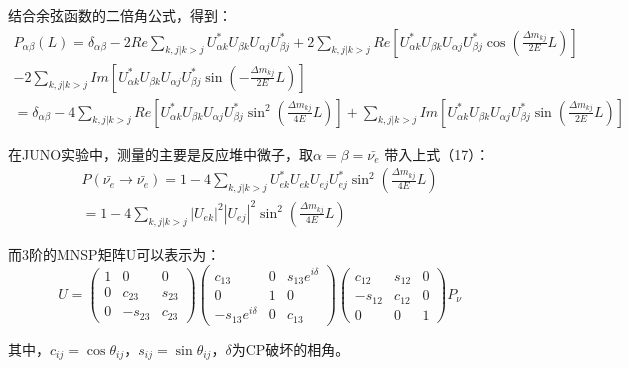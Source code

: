 \documentclass[10pt,a4paper]{article}
\begin{document}
结合余弦函数的二倍角公式，得到：
\begin{equation}
\begin{split}
P_{\alpha\beta}(L)=\delta_{\alpha\beta}-2Re\sum_{k,j |k>j}U_{\alpha k}^{*}U_{\beta k}U_{\alpha j}U_{\beta j}^{*}+2\sum_{k,j |k>j}Re[U_{\alpha k}^{*}U_{\beta k}U_{\alpha j}U_{\beta j}^{*}\cos(\frac{\Delta m_{kj}}{2E}L)]\\-2\sum_{k,j |k>j}Im[U_{\alpha k}^{*}U_{\beta k}U_{\alpha j}U_{\beta j}^{*}\sin(-\frac{\Delta m_{kj}}{2E}L)]\\
=\delta_{\alpha\beta}-4\sum_{k,j |k>j}Re[U_{\alpha k}^{*}U_{\beta k}U_{\alpha j}U_{\beta j}^{*}\sin^2(\frac{\Delta m_{kj}}{4E}L)]+\sum_{k,j |k>j}Im[U_{\alpha k}^{*}U_{\beta k}U_{\alpha j}U_{\beta j}^{*}\sin(\frac{\Delta m_{kj}}{2E}L)]
\end{split}
\end{equation}

在JUNO实验中，测量的主要是反应堆中微子，取$\alpha=\beta=\bar{\nu_e}$
带入上式（17）：
\begin{equation}
\begin{split}
P(\bar{\nu_e}\rightarrow\bar{\nu_e})=1-4\sum_{k,j |k>j}U_{e k}^{*}U_{e k}U_{e j}U_{e j}^{*}\sin^2(\frac{\Delta m_{kj}}{4E}L)\\
=1-4\sum_{k,j |k>j}|U_{e k}|^2|U_{e j}|^2\sin^2(\frac{\Delta m_{kj}}{4E}L)
\end{split}
\end{equation}

而3阶的MNSP矩阵U可以表示为：
\begin{equation}
U = \begin{pmatrix}
 1 & 0 & 0 \\
 0 & c_{23} & s_{23} \\
 0 & -s_{23} & c_{23}
 \end{pmatrix}
 \begin{pmatrix}
 c_{13} & 0 & s_{13}e^{i\delta} \\
 0 & 1 & 0 \\
 -s_{13}e^{i\delta} & 0 & c_{13}
 \end{pmatrix}
 \begin{pmatrix}
 c_{12} & s_{12} & 0 \\
 -s_{12} & c_{12} & 0 \\
 0 & 0 & 1
 \end{pmatrix}P_{\nu}
\end{equation}

其中，$c_{ij}=\cos{\theta_{ij}}$，$s_{ij}=\sin{\theta_{ij}}$，$\delta$为CP破坏的相角。
\end{document}
